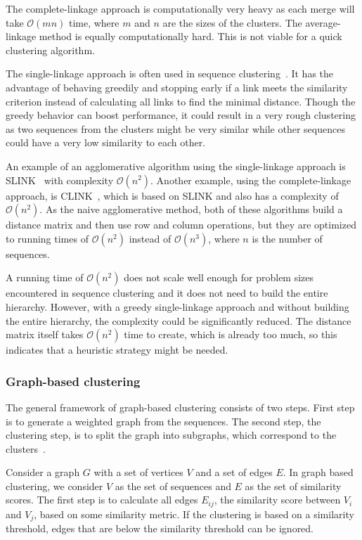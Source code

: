 The complete-linkage approach is computationally very heavy as each merge will
take $\mathcal{O}(mn)$ time, where $m$ and $n$ are the sizes of the clusters.
The average-linkage method is equally computationally hard. This is not viable
for a quick clustering algorithm.

The single-linkage approach is often used in sequence
clustering~\cite[pp.~62--63]{dong}. It has the advantage of behaving greedily
and stopping early if a link meets the similarity criterion instead of
calculating all links to find the minimal distance. Though the greedy behavior
can boost performance, it could result in a very rough clustering as two
sequences from the clusters might be very similar while other sequences could
have a very low similarity to each other.

An example of an agglomerative algorithm using the single-linkage approach is
SLINK~\cite{sibson} with complexity $\mathcal{O}\left(n^2\right)$. Another
example, using the complete-linkage approach, is CLINK~\cite{defays}, which is
based on SLINK and also has a complexity of $\mathcal{O}\left(n^2\right)$. As
the naive agglomerative method, both of these algorithms build a distance
matrix and then use row and column operations, but they are optimized to
running times of $\mathcal{O}\left(n^2\right)$ instead of
$\mathcal{O}\left(n^3\right)$, where $n$ is the number of sequences.

A running time of $\mathcal{O}\left(n^2\right)$ does not scale well enough for
problem sizes encountered in sequence clustering and it does not need to build
the entire hierarchy. However, with a greedy single-linkage approach and
without building the entire hierarchy, the complexity could be significantly
reduced. The distance matrix itself takes $\mathcal{O}\left(n^2\right)$ time
to create, which is already too much, so this indicates that a heuristic
strategy might be needed.


\subsubsection{Graph-based clustering}

The general framework of graph-based clustering consists of two steps. First
step is to generate a weighted graph from the sequences. The second step, the
clustering step, is to split the graph into subgraphs, which correspond to the
clusters~\cite[pp. 64-65]{dong}.

Consider a graph $G$ with a set of vertices $V$ and a set of edges $E$. In
graph based clustering, we consider $V$ as the set of sequences and $E$ as the
set of similarity scores. The first step is to calculate all edges $E_{ij}$,
the similarity score between $V_i$ and $V_j$, based on some similarity metric.
If the clustering is based on a similarity threshold, edges that are below the
similarity threshold can be ignored.

